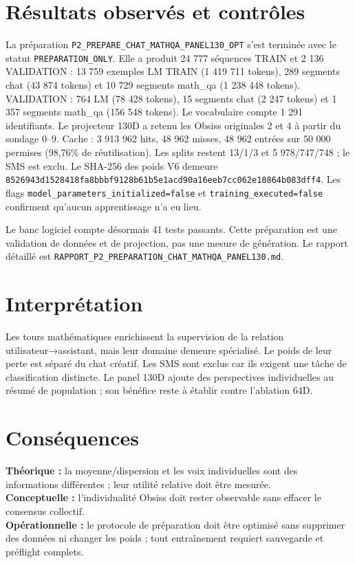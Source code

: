 \documentclass[11pt,a4paper]{report}
\begin{document}
\section{Résultats observés et contrôles}
\begin{sloppypar}
La préparation \texttt{P2\_PREPARE\_CHAT}\allowbreak\texttt{\_MATHQA\_PANEL130}\allowbreak\texttt{\_OPT} s'est terminée avec le statut \texttt{PREPARATION\_ONLY}. Elle a produit 24 777 séquences TRAIN et 2 136 VALIDATION : 13 759 exemples LM TRAIN (1 419 711 tokens), 289 segments chat (43 874 tokens) et 10 729 segments math\_qa (1 238 448 tokens). VALIDATION : 764 LM (78 428 tokens), 15 segments chat (2 247 tokens) et 1 357 segments math\_qa (156 548 tokens). Le vocabulaire compte 1 291 identifiants. Le projecteur 130D a retenu les Obsiss originales 2 et 4 à partir du sondage 0--9. Cache : 3 913 962 hits, 48 962 misses, 48 962 entrées sur 50 000 permises (98,76\% de réutilisation). Les splits restent 13/1/3 et 5 978/747/748 ; le SMS est exclu. Le SHA-256 des poids V6 demeure \texttt{8526943d}\allowbreak\texttt{1528418f}\allowbreak\texttt{a8bbbf91}\allowbreak\texttt{28b61b5e}\allowbreak\texttt{1acd90a1}\allowbreak\texttt{6eeb7cc0}\allowbreak\texttt{62e18864}\allowbreak\texttt{b083dff4}. Les flags \texttt{model\_parameters}\allowbreak\texttt{\_initialized=false} et \texttt{training\_}\allowbreak\texttt{executed=false} confirment qu'aucun apprentissage n'a eu lieu.

Le banc logiciel compte désormais 41 tests passants. Cette préparation est une validation de données et de projection, pas une mesure de génération. Le rapport détaillé est \texttt{RAPPORT\_P2\_PREPARATION\_CHAT\_MATHQA\_PANEL130.md}.
\end{sloppypar}
\section{Interprétation}
Les tours mathématiques enrichissent la supervision de la relation utilisateur→assistant, mais leur domaine demeure spécialisé. Le poids de leur perte est séparé du chat créatif. Les SMS sont exclus car ils exigent une tâche de classification distincte. Le panel 130D ajoute des perspectives individuelles au résumé de population ; son bénéfice reste à établir contre l'ablation 64D.
\section{Conséquences}
\textbf{Théorique :} la moyenne/dispersion et les voix individuelles sont des informations différentes ; leur utilité relative doit être mesurée.\\
\textbf{Conceptuelle :} l'individualité Obsiss doit rester observable sans effacer le consensus collectif.\\
\textbf{Opérationnelle :} le protocole de préparation doit être optimisé sans supprimer des données ni changer les poids ; tout entraînement requiert sauvegarde et préflight complets.
\end{document}
